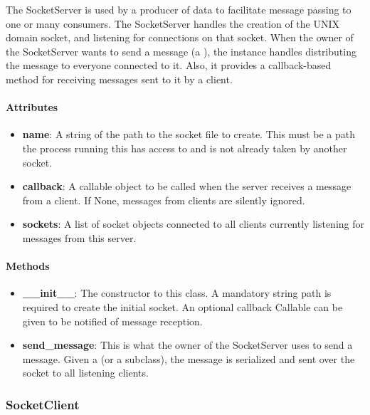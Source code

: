 \documentclass[titlepage]{article}
\begin{document}
The SocketServer is used by a producer of data to facilitate message passing to
one or many consumers.  The SocketServer handles the creation of the UNIX
domain socket, and listening for connections on that socket.  When the owner of
the SocketServer wants to send a message (a ), the
instance handles distributing the message to everyone connected to it.  Also,
it provides a callback-based method for receiving messages sent to it by a
client.

\paragraph{Attributes}
\begin{itemize}
    \item \textbf{name}: A string of the path to the socket file to create.
        This must be a path the process running this has access to and is not
        already taken by another socket.
    \item \textbf{callback}: A callable object to be called when the server
        receives a message from a client.  If None, messages from clients are
        silently ignored.
    \item \textbf{sockets}: A list of socket objects connected to all clients
        currently listening for messages from this server.
\end{itemize}

\paragraph{Methods}
\begin{itemize}
    \item \textbf{\_\_init\_\_}: The constructor to this class.  A mandatory
        string path is required to create the initial socket.  An optional
        callback Callable can be given to be notified of message reception.
    \item \textbf{send\_message}: This is what the owner of the SocketServer
        uses to send a message.  Given a  (or a
        subclass), the message is serialized and sent over the socket to all
        listening clients.
\end{itemize}


\subsubsection{SocketClient
    \label{class-socket-client}
}
\end{document}
